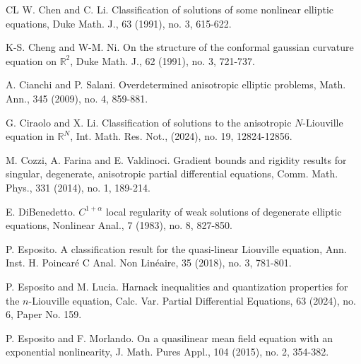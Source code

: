 \documentclass[11pt]{amsart}
\numberwithin{equation}{section}
\begin{document}
\begin{thebibliography}{CL}
 W. Chen and C. Li. Classification of solutions of some nonlinear elliptic equations, Duke Math. J., 63 (1991), no. 3, 615-622.


 K-S. Cheng and W-M. Ni. On the structure of the conformal gaussian curvature equation on $\mathbb{R}^{2}$, Duke Math. J., 62 (1991), no. 3, 721-737.

 A. Cianchi and P. Salani. Overdetermined anisotropic elliptic problems, Math. Ann., 345 (2009), no. 4, 859-881.

 G. Ciraolo and X. Li. Classification of solutions to the anisotropic $N$-Liouville equation in $\mathbb{R}^{N}$, Int. Math. Res. Not.,  (2024), no. 19, 12824-12856.

 M. Cozzi, A. Farina and E. Valdinoci. Gradient bounds and rigidity results for singular, degenerate, anisotropic partial differential equations, Comm. Math. Phys., 331 (2014), no. 1, 189-214.


 E. DiBenedetto. $C^{1+\alpha}$ local regularity of weak solutions of degenerate elliptic equations, Nonlinear Anal., 7 (1983), no. 8, 827-850.


 P. Esposito. A classification result for the quasi-linear Liouville equation, Ann. Inst. H. Poincar\'e C Anal. Non Lin\'eaire, 35 (2018), no. 3, 781-801.

 P. Esposito and M. Lucia. Harnack inequalities and quantization properties for the $n$-Liouville equation, Calc. Var. Partial Differential Equations, 63 (2024), no. 6, Paper No. 159.

 P. Esposito and F. Morlando. On a quasilinear mean field equation with an exponential nonlinearity, J. Math. Pures Appl., 104 (2015), no. 2, 354-382.


\end{thebibliography}
\end{document}
